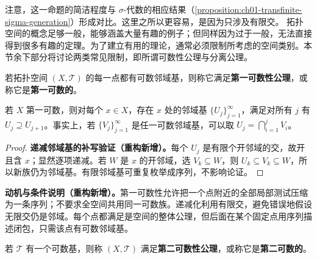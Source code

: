 \documentclass[../../main.tex]{subfiles}%
\begin{document}
注意，这一命题的简洁程度与 $\sigma$-代数的相应结果（\cref{proposition:ch01-transfinite-sigma-generation}）形成对比。这里之所以更容易，是因为只涉及有限交。
拓扑空间的概念足够一般，能够涵盖大量有趣的例子；但同样因为过于一般，无法直接得到很多有趣的定理。为了建立有用的理论，通常必须限制所考虑的空间类别。本节余下部分将讨论两类常见限制，即所谓可数性公理与分离公理。
\begin{definition}[第一可数性]\label{definition:ch04-first-countable}
若拓扑空间 $(X,\mathcal T)$ 的每一点都有可数邻域基，则称它满足\textbf{第一可数性公理}，或称它是\textbf{第一可数的}。
\end{definition}
\begin{proposition}\label{proposition:ch04-nested-countable-base}
若 $X$ 第一可数，则对每个 $x\in X$，存在 $x$ 处的邻域基 $\{U_j\}_{j=1}^\infty$，满足对所有 $j$ 有 $U_j\supseteq U_{j+1}$。事实上，若 $\{V_j\}_{j=1}^\infty$ 是任一可数邻域基，可以取 $U_j=\bigcap_{i=1}^jV_i$。
\end{proposition}
\begin{proof}
\textbf{递减邻域基的补写验证（重构新增）。}每个 $U_j$ 是有限个开邻域的交，故开且含 $x$；显然逐项递减。若 $W$ 是 $x$ 的开邻域，选 $V_k\subseteq W$，则 $U_k\subseteq V_k\subseteq W$，所以新族仍为邻域基。有限邻域基可重复枚举成序列，不影响论证。
\end{proof}
\begin{remark}
\textbf{动机与条件说明（重构新增）。}第一可数性允许把一个点附近的全部局部测试压缩为一条序列；不要求全空间共用同一可数族。递减化利用有限交，避免错误地假设无限交仍是邻域。每个点都满足是空间的整体公理，但后面在某个固定点用序列描述闭包，只需该点有可数邻域基。
\end{remark}
\begin{definition}[第二可数性]\label{definition:ch04-second-countable}
若 $\mathcal T$ 有一个可数基，则称 $(X,\mathcal T)$ 满足\textbf{第二可数性公理}，或称它是\textbf{第二可数的}。
\end{definition}
\end{document}
